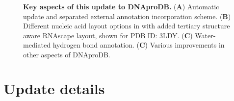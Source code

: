 \begin{center}
    \begin{figure}
        \caption[Key aspects of this update to DNAproDB.]{\textbf{Key aspects of this update to DNAproDB.} ({\bf A}) Automatic update and separated external annotation incorporation scheme.  ({\bf B})  Different nucleic acid layout options in with added tertiary structure aware RNAscape layout, shown for PDB ID: 3LDY. ({\bf C}) Water-mediated hydrogen bond annotation. ({\bf C}) Various improvements in other aspects of DNAproDB. }
  \label{fig:dnaprodb1}
\end{figure}
\end{center}


\section{Update details}

